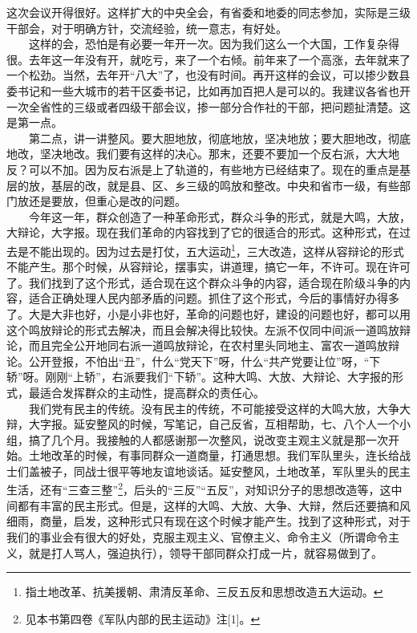 \documentclass[cn,11pt,chinese]{elegantbook}
\begin{document}
这次会议开得很好。这样扩大的中央全会，有省委和地委的同志参加，实际是三级干部会，对于明确方针，交流经验，统一意志，有好处。\\
　　这样的会，恐怕是有必要一年开一次。因为我们这么一个大国，工作复杂得很。去年这一年没有开，就吃亏，来了一个右倾。前年来了一个高涨，去年就来了一个松劲。当然，去年开“八大”了，也没有时间。再开这样的会议，可以掺少数县委书记和一些大城市的若干区委书记，比如再加百把人是可以的。我建议各省也开一次全省性的三级或者四级干部会议，掺一部分合作社的干部，把问题扯清楚。这是第一点。\\
　　第二点，讲一讲整风。要大胆地放，彻底地放，坚决地放；要大胆地改，彻底地改，坚决地改。我们要有这样的决心。那末，还要不要加一个反右派，大大地反？可以不加。因为反右派是上了轨道的，有些地方已经结束了。现在的重点是基层的放，基层的改，就是县、区、乡三级的鸣放和整改。中央和省市一级，有些部门放还是要放，但重心是改的问题。\\
　　今年这一年，群众创造了一种革命形式，群众斗争的形式，就是大鸣，大放，大辩论，大字报。现在我们革命的内容找到了它的很适合的形式。这种形式，在过去是不能出现的。因为过去是打仗，五大运动\footnote[1]{ 指土地改革、抗美援朝、肃清反革命、三反五反和思想改造五大运动。}，三大改造，这样从容辩论的形式不能产生。那个时候，从容辩论，摆事实，讲道理，搞它一年，不许可。现在许可了。我们找到了这个形式，适合现在这个群众斗争的内容，适合现在阶级斗争的内容，适合正确处理人民内部矛盾的问题。抓住了这个形式，今后的事情好办得多了。大是大非也好，小是小非也好，革命的问题也好，建设的问题也好，都可以用这个鸣放辩论的形式去解决，而且会解决得比较快。左派不仅同中间派一道鸣放辩论，而且完全公开地同右派一道鸣放辩论，在农村里头同地主、富农一道鸣放辩论。公开登报，不怕出“丑”，什么“党天下”呀，什么“共产党要让位”呀，“下轿”呀。刚刚“上轿”，右派要我们“下轿”。这种大鸣、大放、大辩论、大字报的形式，最适合发挥群众的主动性，提高群众的责任心。\\
　　我们党有民主的传统。没有民主的传统，不可能接受这样的大鸣大放，大争大辩，大字报。延安整风的时候，写笔记，自己反省，互相帮助，七、八个人一个小组，搞了几个月。我接触的人都感谢那一次整风，说改变主观主义就是那一次开始。土地改革的时候，有事同群众一道商量，打通思想。我们军队里头，连长给战士们盖被子，同战士很平等地友谊地谈话。延安整风，土地改革，军队里头的民主生活，还有“三查三整”\footnote[2]{ 见本书第四卷《军队内部的民主运动》注[1]。}，后头的“三反”“五反”，对知识分子的思想改造等，这中间都有丰富的民主形式。但是，这样的大鸣、大放、大争、大辩，然后还要搞和风细雨，商量，启发，这种形式只有现在这个时候才能产生。找到了这种形式，对于我们的事业会有很大的好处，克服主观主义、官僚主义、命令主义（所谓命令主义，就是打人骂人，强迫执行），领导干部同群众打成一片，就容易做到了。\\
\end{document}
